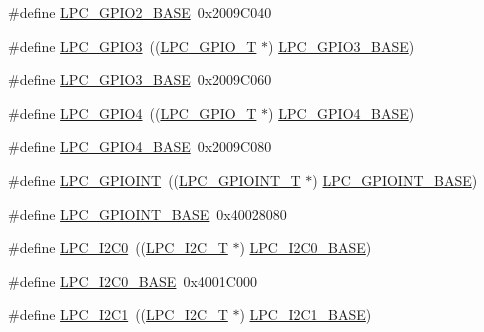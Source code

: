 \begin{DoxyCompactItemize}
\#define \hyperlink{group__PERIPH__175X__6X__BASE_gae5524b2d728167194033ec7a1841a36b}{L\+P\+C\+\_\+\+G\+P\+I\+O2\+\_\+\+B\+A\+SE}~0x2009\+C040
\item 
\#define \hyperlink{group__PERIPH__175X__6X__BASE_ga6e961eb01d0f1e61dd9b9d5979d2aafc}{L\+P\+C\+\_\+\+G\+P\+I\+O3}~((\hyperlink{structLPC__GPIO__T}{L\+P\+C\+\_\+\+G\+P\+I\+O\+\_\+T}             $\ast$) \hyperlink{group__PERIPH__407X__8X__BASE_ga56c68c5326b521b3278a35f4d81369a9}{L\+P\+C\+\_\+\+G\+P\+I\+O3\+\_\+\+B\+A\+SE})
\item 
\#define \hyperlink{group__PERIPH__175X__6X__BASE_ga56c68c5326b521b3278a35f4d81369a9}{L\+P\+C\+\_\+\+G\+P\+I\+O3\+\_\+\+B\+A\+SE}~0x2009\+C060
\item 
\#define \hyperlink{group__PERIPH__175X__6X__BASE_ga652a560a972d4edec8a67cd85ad4bd60}{L\+P\+C\+\_\+\+G\+P\+I\+O4}~((\hyperlink{structLPC__GPIO__T}{L\+P\+C\+\_\+\+G\+P\+I\+O\+\_\+T}             $\ast$) \hyperlink{group__PERIPH__407X__8X__BASE_gaa54352e7745932e78b56bcbc1d70fa21}{L\+P\+C\+\_\+\+G\+P\+I\+O4\+\_\+\+B\+A\+SE})
\item 
\#define \hyperlink{group__PERIPH__175X__6X__BASE_gaa54352e7745932e78b56bcbc1d70fa21}{L\+P\+C\+\_\+\+G\+P\+I\+O4\+\_\+\+B\+A\+SE}~0x2009\+C080
\item 
\#define \hyperlink{group__PERIPH__175X__6X__BASE_gaefe2f52407c1ce58395766dc760525b5}{L\+P\+C\+\_\+\+G\+P\+I\+O\+I\+NT}~((\hyperlink{structLPC__GPIOINT__T}{L\+P\+C\+\_\+\+G\+P\+I\+O\+I\+N\+T\+\_\+T}          $\ast$) \hyperlink{group__PERIPH__407X__8X__BASE_gadf88491f4b83b5af99eaf30778cb62fa}{L\+P\+C\+\_\+\+G\+P\+I\+O\+I\+N\+T\+\_\+\+B\+A\+SE})
\item 
\#define \hyperlink{group__PERIPH__175X__6X__BASE_gadf88491f4b83b5af99eaf30778cb62fa}{L\+P\+C\+\_\+\+G\+P\+I\+O\+I\+N\+T\+\_\+\+B\+A\+SE}~0x40028080
\item 
\#define \hyperlink{group__PERIPH__175X__6X__BASE_ga14b6c56857e970a682a9bb22a0cb6716}{L\+P\+C\+\_\+\+I2\+C0}~((\hyperlink{structLPC__I2C__T}{L\+P\+C\+\_\+\+I2\+C\+\_\+T}              $\ast$) \hyperlink{group__PERIPH__407X__8X__BASE_gab4476c9e874621194369f74fcf26ce92}{L\+P\+C\+\_\+\+I2\+C0\+\_\+\+B\+A\+SE})
\item 
\#define \hyperlink{group__PERIPH__175X__6X__BASE_gab4476c9e874621194369f74fcf26ce92}{L\+P\+C\+\_\+\+I2\+C0\+\_\+\+B\+A\+SE}~0x4001\+C000
\item 
\#define \hyperlink{group__PERIPH__175X__6X__BASE_gad6d6333e47875813be171cffef258837}{L\+P\+C\+\_\+\+I2\+C1}~((\hyperlink{structLPC__I2C__T}{L\+P\+C\+\_\+\+I2\+C\+\_\+T}              $\ast$) \hyperlink{group__PERIPH__407X__8X__BASE_gae59f73cf24ff126be3b9a8b921926676}{L\+P\+C\+\_\+\+I2\+C1\+\_\+\+B\+A\+SE})

\end{DoxyCompactItemize}
